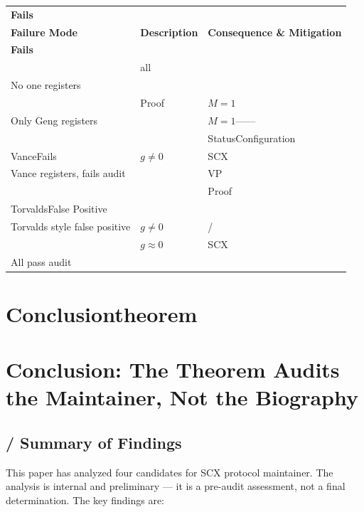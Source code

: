 \documentclass[12pt,a4paper]{article}
\theoremstyle{remark}
\begin{document}
\begin{center}
\begin{longtable}{p{} p{} p{}}
\toprule
\textbf{Fails} & \textbf{} & \textbf{} \\
\textbf{Failure Mode} & \textbf{Description} & \textbf{Consequence \& Mitigation} \\
\midrule
\endfirsthead
\toprule
\textbf{Fails} & \textbf{} & \textbf{} \\
\midrule
\endhead
\bottomrule
\endfoot
\midrule
 & all &  \\
No one registers &  &  \\
\midrule
 & Proof & $M=1$ \\
Only Geng registers &  & $M=1$—— \\
& & StatusConfiguration \\
\midrule
VanceFails & $g \neq 0$ & SCX \\
Vance registers, fails audit &  & VP \\
& & Proof \\
\midrule
TorvaldsFalse Positive &  &  \\
Torvalds style false positive & $g \neq 0$ & / \\
\midrule
 & $g \approx 0$ & SCX \\
All pass audit &  &  \\
\bottomrule
\end{longtable}
\end{center}

\newpage

\section{Conclusiontheorem}
\section{Conclusion: The Theorem Audits the Maintainer, Not the Biography}

\subsection{ / Summary of Findings}

This paper has analyzed four candidates for SCX protocol maintainer. The
analysis is internal and preliminary — it is a pre-audit assessment, not a
final determination. The key findings are:
\end{document}
